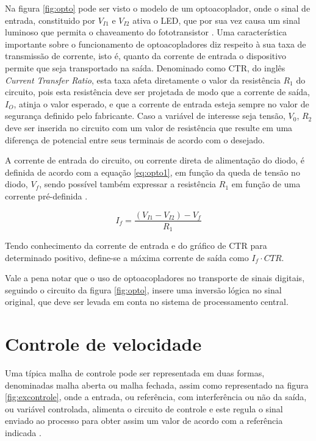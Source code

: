 Na figura \ref{fig:opto} pode ser visto o modelo de um optoacoplador, onde o 
sinal de entrada, constituido por $V_{I1}$ e $V_{I2}$ ativa o LED, que
por sua vez causa um sinal luminoso que permita o chaveamento do 
fototransistor \cite{bishop2001understand}. Uma característica importante
sobre o funcionamento de optoacopladores diz respeito à sua taxa de 
transmissão de corrente, isto é, quanto da corrente de entrada o 
dispositivo permite que seja transportado na saída. Denominado como 
CTR, do inglês \textit{Current Transfer Ratio}, esta taxa afeta
diretamente o valor da resistência $R_1$ do circuito, 
pois esta resistência deve ser projetada de modo que a corrente de 
saída, $I_O$, atinja o valor esperado, e que a corrente de entrada 
esteja sempre no valor de segurança definido pelo fabricante. Caso a 
variável de interesse seja tensão, $V_0$, $R_2$ deve ser inserida no 
circuito com um valor de resistência que resulte em uma diferença de
potencial entre seus terminais de acordo com o desejado.

A corrente de entrada do circuito, ou corrente direta de alimentação 
do diodo, é definida de acordo com a equação \ref{eq:opto1}, em função
da queda de tensão no diodo, $V_f$, sendo possível também expressar a 
resistência $R_1$ em função de uma corrente pré-definida \cite{sedra1998microelectronic}.

\begin{equation}
    \label{eq:opto1}
    I_f = \frac{\left(V_{I1}-V_{I2}\right) - V_f}{R_1}
\end{equation}

Tendo conhecimento da corrente de entrada e do gráfico de CTR para 
determinado positivo, define-se a máxima corrente de saída como
$I_f \cdot CTR$. 

Vale a pena notar que o uso de optoacopladores no transporte de sinais digitais,
seguindo o circuito da figura \ref{fig:opto}, insere uma 
inversão lógica no sinal original, que deve ser levada em conta no
sistema de processamento central.

\section{Controle de velocidade}
Uma típica malha de controle pode ser representada em duas formas, denominadas malha aberta ou malha fechada, assim como representado na figura \ref{fig:excontrole},
onde a entrada, ou referência, com interferência ou não da saída, ou variável controlada, alimenta o circuito de controle e este regula o sinal enviado ao processo
para obter assim um valor de acordo com a referência indicada \cite{nise2011control}. 


